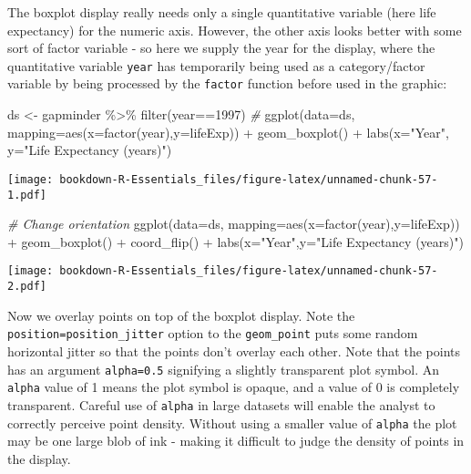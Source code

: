 \documentclass[
]{book}
\newenvironment{Shaded}{\begin{snugshade}}{\end{snugshade}}
\newcommand{\AttributeTok}[1]{\textcolor[rgb]{0.77,0.63,0.00}{#1}}
\newcommand{\CommentTok}[1]{\textcolor[rgb]{0.56,0.35,0.01}{\textit{#1}}}
\newcommand{\DecValTok}[1]{\textcolor[rgb]{0.00,0.00,0.81}{#1}}
\newcommand{\FunctionTok}[1]{\textcolor[rgb]{0.00,0.00,0.00}{#1}}
\newcommand{\NormalTok}[1]{#1}
\newcommand{\OtherTok}[1]{\textcolor[rgb]{0.56,0.35,0.01}{#1}}
\newcommand{\SpecialCharTok}[1]{\textcolor[rgb]{0.00,0.00,0.00}{#1}}
\newcommand{\StringTok}[1]{\textcolor[rgb]{0.31,0.60,0.02}{#1}}
\begin{document}
The boxplot display really needs only a single quantitative variable (here life expectancy) for the numeric axis. However, the other axis looks better with some
sort of factor variable - so here we supply the year for the display, where the quantitative variable \texttt{year} has temporarily being used as a category/factor variable by being processed by the \texttt{factor} function before used in the graphic:

\begin{Shaded}
\begin{Highlighting}[]
\NormalTok{ds }\OtherTok{\textless{}{-}}\NormalTok{ gapminder }\SpecialCharTok{\%\textgreater{}\%} \FunctionTok{filter}\NormalTok{(year}\SpecialCharTok{==}\DecValTok{1997}\NormalTok{) }
\CommentTok{\#}
\FunctionTok{ggplot}\NormalTok{(}\AttributeTok{data=}\NormalTok{ds, }\AttributeTok{mapping=}\FunctionTok{aes}\NormalTok{(}\AttributeTok{x=}\FunctionTok{factor}\NormalTok{(year),}\AttributeTok{y=}\NormalTok{lifeExp)) }\SpecialCharTok{+}
 \FunctionTok{geom\_boxplot}\NormalTok{() }\SpecialCharTok{+} 
  \FunctionTok{labs}\NormalTok{(}\AttributeTok{x=}\StringTok{"Year"}\NormalTok{,}
       \AttributeTok{y=}\StringTok{"Life Expectancy (years)"}\NormalTok{)}
\end{Highlighting}
\end{Shaded}

\texttt{[image: bookdown-R-Essentials\_files/figure-latex/unnamed-chunk-57-1.pdf]}

\begin{Shaded}
\begin{Highlighting}[]
\CommentTok{\# Change orientation}
\FunctionTok{ggplot}\NormalTok{(}\AttributeTok{data=}\NormalTok{ds, }\AttributeTok{mapping=}\FunctionTok{aes}\NormalTok{(}\AttributeTok{x=}\FunctionTok{factor}\NormalTok{(year),}\AttributeTok{y=}\NormalTok{lifeExp)) }\SpecialCharTok{+}
 \FunctionTok{geom\_boxplot}\NormalTok{() }\SpecialCharTok{+} 
  \FunctionTok{coord\_flip}\NormalTok{() }\SpecialCharTok{+} 
  \FunctionTok{labs}\NormalTok{(}\AttributeTok{x=}\StringTok{"Year"}\NormalTok{,}\AttributeTok{y=}\StringTok{"Life Expectancy (years)"}\NormalTok{)}
\end{Highlighting}
\end{Shaded}

\texttt{[image: bookdown-R-Essentials\_files/figure-latex/unnamed-chunk-57-2.pdf]}

Now we overlay points on top of the boxplot display. Note the \texttt{position=position\_jitter} option to the \texttt{geom\_point} puts some random horizontal jitter so that the points don't overlay each other. Note that the points has an argument \texttt{alpha=0.5} signifying a slightly transparent plot symbol. An \texttt{alpha} value of 1 means the plot symbol is opaque, and a value of 0 is completely transparent. Careful use of \texttt{alpha} in large datasets will enable the analyst to correctly perceive point density. Without using a smaller value of \texttt{alpha} the plot may be one large blob of ink - making it difficult to judge the density of points in the display.
\end{document}

